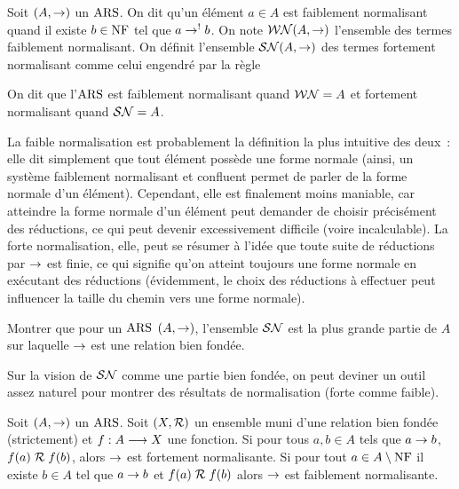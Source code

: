 \begin{definition}
  Soit $(A,\mathrel{\to})$ un $\operatorname{ARS}$. On dit qu'un élément $a \in A$ est faiblement
  normalisant quand il existe $b \in \operatorname{NF}$ tel que $a\mathrel{\to}^{\mathord{!}} b$. On note
  $\mathcal{WN}(A,\mathrel{\to})$ l'ensemble des termes faiblement normalisant. On définit
  l'ensemble $\mathcal{SN}(A,\mathrel{\to})$ des termes fortement normalisant comme celui
  engendré par la règle
  \begin{prooftree}
  \end{prooftree}
  On dit que l'$\operatorname{ARS}$ est faiblement normalisant quand $\mathcal{WN} = A$ et fortement
  normalisant quand $\mathcal{SN} = A$.
  \index[notation]{$\SN$}
  \index[notation]{$\WN$}
\end{definition}

La faible normalisation est probablement la définition la plus intuitive des
deux~: elle dit simplement que tout élément possède une forme normale (ainsi,
un système faiblement normalisant et confluent permet de parler de \og la\fg
forme normale d'un élément). Cependant, elle est finalement moins maniable,
car atteindre la forme normale d'un élément peut demander de choisir
précisément des réductions, ce qui peut devenir excessivement difficile (voire
incalculable). La forte normalisation, elle, peut se résumer à l'idée que
toute suite de réductions par $\mathrel{\to}$ est finie, ce qui signifie qu'on
atteint toujours une forme normale en exécutant des réductions (évidemment,
le choix des réductions à effectuer peut influencer la taille du chemin vers
une forme normale).

\begin{exercise}
  Montrer que pour un $\operatorname{ARS}$ $(A,\mathrel{\to})$, l'ensemble $\SN$ est la plus grande
  partie de $A$ sur laquelle $\mathrel{\to}$ est une relation bien fondée.
\end{exercise}

Sur la vision de $\SN$ comme une partie bien fondée, on peut deviner un outil
assez naturel pour montrer des résultats de normalisation (forte comme faible).

\begin{proposition}\label{prop.normalisation.wfFun}
  Soit $(A,\mathrel{\to})$ un $\operatorname{ARS}$. Soit $(X,\mathrel{\mathcal{R}})$ un ensemble muni d'une relation
  bien fondée (strictement) et $f : \displaystyle A \longrightarrow X$ une fonction. Si pour
  tous $a,b \in A$ tels que $a\mathrel{\to} b$, $f(a)\mathrel{\mathcal{R}} f(b)$, alors $\mathrel{\to}$ est
  fortement normalisante. Si pour tout $a \in A\setminus \operatorname{NF}$ il existe
  $b \in A$ tel que $a\mathrel{\to} b$ et $f(a)\mathrel{\mathcal{R}} f(b)$ alors $\mathrel{\to}$ est
  faiblement normalisante.
\end{proposition}

